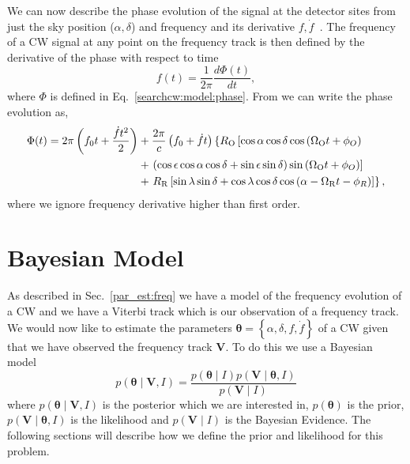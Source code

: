 We can now describe the phase evolution of the signal at the detector
sites from just the sky
position ($\alpha, \delta$) and frequency and its derivative
$f,\dot{f}$~. The frequency of a \gls{CW}
signal at any point on the frequency track is then defined by the derivative of
the phase with respect to time~
%
\begin{equation}
    f(t) = \frac{1}{2\pi}\frac{d\Phi(t)}{dt}, 
\end{equation}
%
where $\Phi$ is defined in Eq.~\ref{searchcw:model:phase}.  From
\citep{schutz1998DataAnalysis} we can write the phase evolution as,
%
\begin{equation}
    \label{par_est:freq:ph_evolution}
    \begin{split}
        \Phi(t) = 2\pi \left(  f_0 t + \frac{\dot{f} t^2}{2} \right) &+ \frac{2\pi}{c} \left(  f_0 + \dot{f}t  \right) \left\{ R_{\rm{O}} \left[ \cos \alpha \cos \delta \cos \left( \Omega_{\mathrm{O}} t + \phi_{O}  \right) \right. \right. \\ 
        &+ \left. \left( \cos \epsilon \cos \alpha \cos \delta +  \sin \epsilon \sin \delta \right) \sin \left( \Omega_{\mathrm{O}} t + \phi_{O}  \right) \right] \\
        &+ \left. R_{\rm{R}} \left[ \sin \lambda \sin \delta + \cos \lambda \cos \delta \cos \left( \alpha - \Omega_{\mathrm{R}} t - \phi_{R}  \right)     \right] \right\},
    \end{split}
\end{equation}
%
where we ignore frequency derivative higher than first order.~

%
%
\section{\label{par_est:bayes}Bayesian Model}
%
%

As described in Sec.~\ref{par_est:freq} we have a model of the frequency
evolution of a \gls{CW} and we have a Viterbi track which is our observation of
a frequency track.  We would now like to estimate the parameters $\bm{\theta} =
\left\{\alpha, \delta, f, \dot{f} \right\}$ of a \gls{CW} given that we have
observed the frequency track $\bm{V}$.  To do this we use a Bayesian model
%
\begin{equation}
    \label{par_est:bayes:eqn}
    p(\bm{\theta} \mid \bm{V}, I) = \frac{p(\bm{\theta} \mid I) p(\bm{V} \mid \bm{\theta}, I)}{p(\bm{V} \mid I)}
\end{equation}
%
where $p(\bm{\theta} \mid \bm{V}, I)$ is the posterior which we are interested in,
$p(\bm{\theta})$ is the prior, $p(\bm{V} \mid \bm{\theta}, I)$ is the
likelihood and $p(\bm{V} \mid I)$ is the Bayesian Evidence. The
following sections will describe how we define the prior and likelihood for
this problem.

